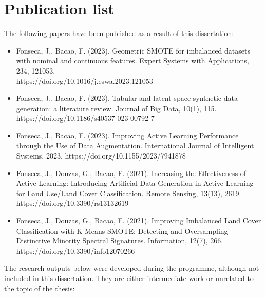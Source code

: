 \chapter*{Publication list}

The following papers have been published as a result of this dissertation:

\begin{itemize}

    \item Fonseca, J., Bacao, F. (2023). Geometric SMOTE for imbalanced
        datasets with nominal and continuous features. Expert Systems with
        Applications, 234, 121053. \\
        https://doi.org/10.1016/j.eswa.2023.121053

    \item Fonseca, J., Bacao, F. (2023). Tabular and latent space synthetic
        data generation: a literature review. Journal of Big Data, 10(1), 115. 
        https://doi.org/10.1186/s40537-023-00792-7

    \item Fonseca, J., Bacao, F. (2023). Improving Active Learning
        Performance through the Use of Data Augmentation. International
        Journal of Intelligent Systems, 2023.
        https://doi.org/10.1155/2023/7941878

    \item Fonseca, J., Douzas, G., Bacao, F. (2021). Increasing the
        Effectiveness of Active Learning: Introducing Artificial Data
        Generation in Active Learning for Land Use/Land Cover Classification.
        Remote Sensing, 13(13), 2619.  https://doi.org/10.3390/rs13132619

    \item Fonseca, J., Douzas, G., Bacao, F. (2021). Improving Imbalanced Land
        Cover Classification with K-Means SMOTE: Detecting and Oversampling
        Distinctive Minority Spectral Signatures. Information, 12(7), 266.
        https://doi.org/10.3390/info12070266

\end{itemize}

The research outputs below were developed during the programme, although
not included in this dissertation. They are either intermediate work or
unrelated to the topic of the thesis:

